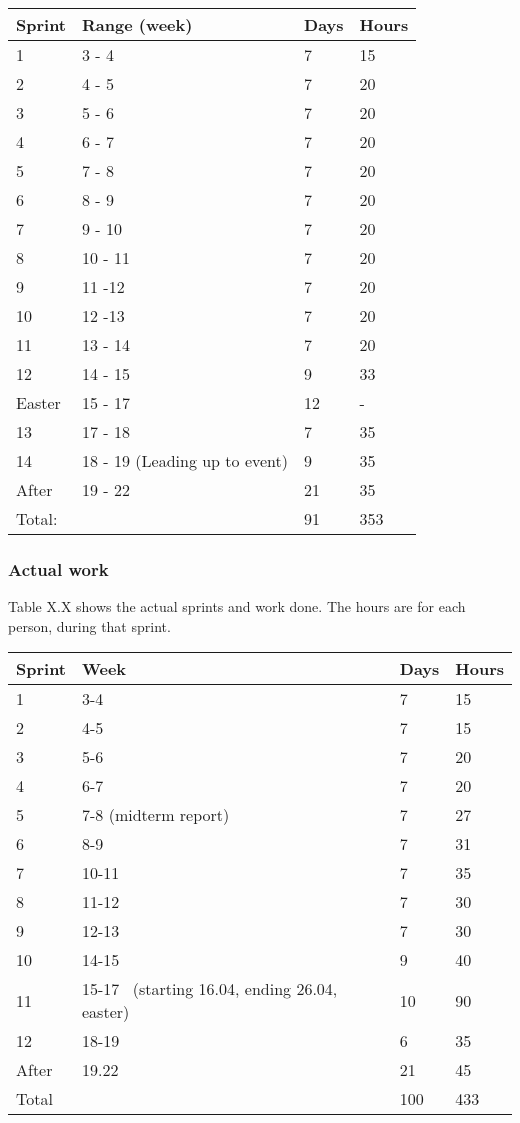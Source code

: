 \begin{tabular}{|l|l|l|l|}
\hline
 Sprint & Range (week) & Days &
 Hours\\\hline
 1 & 3 - 4 & 7 & 15\\\hline
 2 & 4 - 5 & 7 & 20\\\hline
 3 & 5 - 6 & 7 & 20 \\\hline
 4 & 6 - 7 & 7 & 20 \\\hline
 5 & 7 - 8 & 7 & 20\\\hline
 6 & 8 - 9  & 7 & 20\\\hline
 7 & 9 - 10 & 7 & 20\\\hline
 8 & 10 - 11 & 7 & 20\\\hline
 9 & 11 -12 & 7 & 20\\\hline
 10 & 12 -13 & 7 & 20\\\hline
 11 & 13 - 14 & 7 & 20\\\hline
 12  & 14 - 15  & 9 & 33\\\hline
 Easter & 15 - 17 & 12 & {}-\\\hline
 13 & 17 - 18 & 7 & 35\\\hline
 14 & 18 - 19 (Leading up to event) & 9 & 35\\\hline
 After & 19 - 22 & 21 & 35\\\hline
 Total:  & & 91 & 353\\\hline
\end{tabular}


\subsubsection{Actual work}
Table X.X shows the actual sprints and work done. The hours are for each
person, during that sprint.
\begin{tabular}{|l|l|l|l|}
\hline
 Sprint & Week & Days & Hours \\\hline
 1 & 3-4 & 7 & 15\\\hline
 2 & 4-5  & 7  & 15\\\hline
 3 & 5-6 & 7  & 20\\\hline
 4 & 6-7 & 7 & 20\\\hline
 5 & 7-8 (midterm report) & 7 & 27\\\hline
 6 & 8-9  & 7  & 31\\\hline
 7 & 10-11 & 7  & 35\\\hline
 8 & 11-12 & 7 & 30\\\hline
 9 & 12-13 & 7  & 30\\\hline
 10 & 14-15 & 9 & 40\\\hline
 11 & 15-17 \ (starting 16.04, ending 26.04, easter) & 10 & 90\\\hline
 12 & 18-19 & 6 & 35\\\hline
 After & 19.22 & 21 & 45\\\hline
 Total & & 100 & 433\\\hline
\end{tabular}
